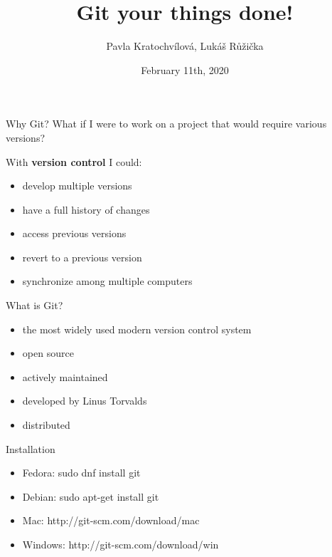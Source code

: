 \documentclass[14pt]{beamer}
\begin{document}
	\author{Pavla Kratochvílová, Lukáš Růžička}
	\title{Git your things done!}
	\date{February 11th, 2020}
	\begin{frame}[plain]
		\maketitle
	\end{frame}

	\begin{frame}{Why Git?}
		What if I were to work on a project that would require various versions? 
		
		With \textbf{version control} I could:
		
		\vspace{5pt}
		
	\begin{itemize}
		\item develop multiple versions
		\item have a full history of changes
		\item access previous versions
		\item revert to a previous version
		\item synchronize among multiple computers
	\end{itemize}
\end{frame}
	
	\begin{frame}{What is Git?}
		\begin{itemize}
		\item the most widely used modern version control system
		\item open source
		\item actively maintained
		\item developed by Linus Torvalds
		\item distributed 
		\end{itemize}
	\end{frame}

	\begin{frame}{Installation}
		\begin{itemize}
		\item Fedora: sudo dnf install git
		\item Debian: sudo apt-get install git
		\item Mac: http://git-scm.com/download/mac
		\item Windows: http://git-scm.com/download/win
		\end{itemize}
	\end{frame}
\end{document}
